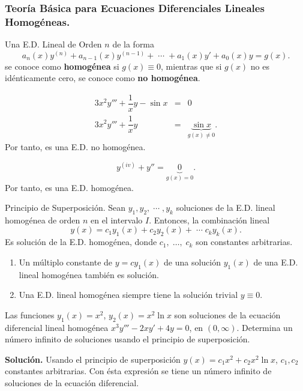 \documentclass{beamer}
\begin{document}
\frame{\titlepage}

\begin{frame}[t]
	\frametitle{Teoría Básica para Ecuaciones Diferenciales Lineales Homogéneas.}
\begin{definition}
	Una E.D. Lineal de Orden \(n\) de la forma
	\[
		a_n(x) y^{(n)} +a_{n-1} (x) y^{(n-1)} + \;\cdots\; + a_1(x) y' +a_0(x) y = g(x).
	\]
	se conoce como \textbf{homogénea} si \(g(x) \equiv 0\), mientras que si \(g(x)\) no es idénticamente cero, se conoce como \textbf{no homogénea}.
\end{definition}
	\begin{example}
		\[
			\begin{array}{rcl}
				3x^2y''' + \dfrac{1}{x} y - \sin x & = & 0 \\[2mm]
				3x^2y''' + \dfrac{1}{x} y & = & \underbrace{\sin x} _{g(x) \ne 0} .
			\end{array}
		\]
		Por tanto, es una E.D. no homogénea.
	\end{example}
\end{frame}

\begin{frame}[t]
	\begin{example}
		\[
			y^{(iv)} +y'' = \underbrace{0} _{g(x) =0}.
		\]
		Por tanto, es una E.D. homogénea.
	\end{example} 
	\begin{block}{Principio de Superposición.}
		Sean \(y_1,y_2, \;\cdots\; ,y_k\) soluciones de la E.D. lineal homogénea de orden \(n\) en el intervalo \(I\). Entonces, la combinación lineal
		\[
			y(x) = c_1y_1(x) + c_2y_2(x) + \;\cdots\; c_ky_k(x).
		\]
		Es solución de la E.D. homogénea, donde \(c_1, \;\ldots,\; c_k\) son constantes arbitrarias.
	\end{block}
\end{frame}

\begin{frame}[t]
	\begin{corollary}
		\begin{enumerate}
			\item Un múltiplo constante de \(y=cy_1(x)\) de una solución \(y_1(x)\) de una E.D. lineal homogénea también es solución.
			\item Una E.D. lineal homogénea siempre tiene la solución trivial \(y \equiv 0\).
		\end{enumerate}
	\end{corollary} 
	\begin{example}
		Las funciones \(y_1(x) = x^2\), \(y_2(x) =x^2 \ln x\) son soluciones de la ecuación diferencial lineal homogénea \(x^3y''' -2xy' +4y=0\), en \((0, \infty)\). Determina un número infinito de soluciones usando el principio de superposición.
	\end{example}
	\begin{exampleblock}{}
		\textbf{Solución.} Usando el principio de superposición \(y(x) = c_1x^2+c_2x^2 \ln x\), \(c_1,c_2\) constantes arbitrarias. Con ésta expresión se tiene un número infinito de soluciones de la ecuación diferencial. \\[2mm]
	\end{exampleblock}
\end{frame}
\end{document}
